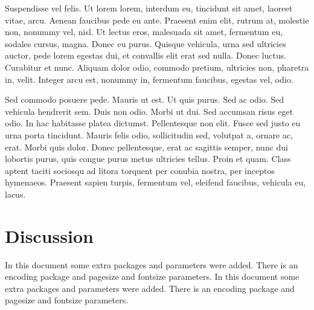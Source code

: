 Suspendisse vel felis. Ut lorem lorem, interdum eu, tincidunt sit amet, laoreet vitae, arcu.
Aenean faucibus pede eu ante. Praesent enim elit, rutrum at, molestie non, nonummy vel, nisl. Ut
lectus eros, malesuada sit amet, fermentum eu, sodales cursus, magna. Donec eu purus. Quisque
vehicula, urna sed ultricies auctor, pede lorem egestas dui, et convallis elit erat sed nulla. Donec
luctus. Curabitur et nunc. Aliquam dolor odio, commodo pretium, ultricies non, pharetra in,
velit. Integer arcu est, nonummy in, fermentum faucibus, egestas vel, odio.

Sed commodo posuere pede. Mauris ut est. Ut quis purus. Sed ac odio. Sed vehicula
hendrerit sem. Duis non odio. Morbi ut dui. Sed accumsan risus eget odio. In hac habitasse
platea dictumst. Pellentesque non elit. Fusce sed justo eu urna porta tincidunt. Mauris felis odio,
sollicitudin sed, volutpat a, ornare ac, erat. Morbi quis dolor. Donec pellentesque, erat ac sagittis
semper, nunc dui lobortis purus, quis congue purus metus ultricies tellus. Proin et quam. Class
aptent taciti sociosqu ad litora torquent per conubia nostra, per inceptos hymenaeos. Praesent
sapien turpis, fermentum vel, eleifend faucibus, vehicula eu, lacus.

\section{Discussion}

\lipsum[9-14]

In this document some extra packages and parameters
were added. There is an encoding package
and pagesize and fontsize parameters.
In this document some extra packages and parameters
were added. There is an encoding package
and pagesize \textcite{Albarella2001} and fontsize parameters.